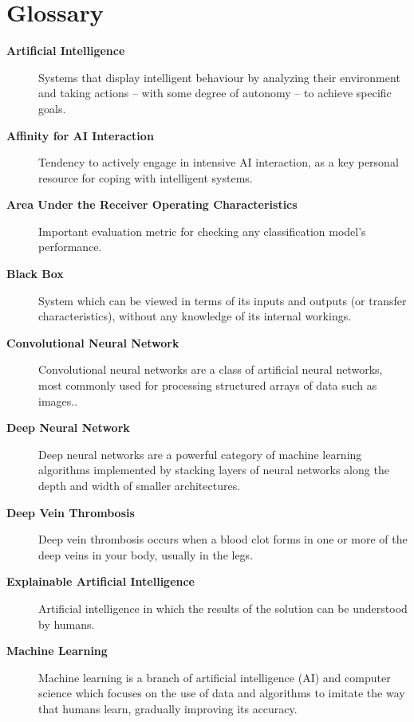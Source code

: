 \chapter*{Glossary}
\begin{description}
    \item [\textbf{Artificial Intelligence}] Systems that display intelligent behaviour by analyzing their environment and taking actions – with some degree of autonomy – to achieve specific goals.
    \item [\textbf{Affinity for AI Interaction}] Tendency to actively engage in intensive AI interaction, as a key personal resource for coping with intelligent systems.
    \item [\textbf{Area Under the Receiver Operating Characteristics}] Important evaluation metric for checking any classification model’s performance.
    \item [\textbf{Black Box}] System which can be viewed in terms of its inputs and outputs (or transfer characteristics), without any knowledge of its internal workings.
    \item [\textbf{Convolutional Neural Network}] Convolutional neural networks are a class of artificial neural networks, most commonly used for processing structured arrays of data such as images..
    \item [\textbf{Deep Neural Network}] Deep neural networks are a powerful category of machine learning algorithms implemented by stacking layers of neural networks along the depth and width of smaller architectures.
    \item [\textbf{Deep Vein Thrombosis}] Deep vein thrombosis occurs when a blood clot forms in one or more of the deep veins in your body, usually in the legs.
    \item [\textbf{Explainable Artificial Intelligence}] Artificial intelligence in which the results of the solution can be understood by humans.
    \item [\textbf{Machine Learning}] Machine learning is a branch of artificial intelligence (AI) and computer science which focuses on the use of data and algorithms to imitate the way that humans learn, gradually improving its accuracy.
\end{description}
\clearpage

{}
